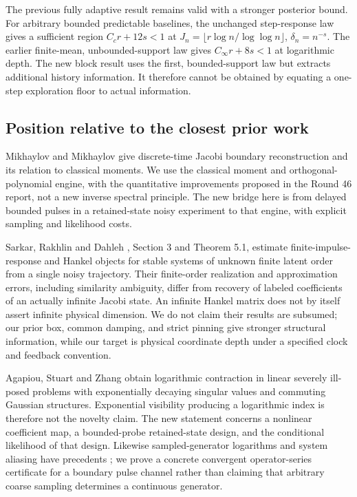 The previous fully adaptive result remains valid with a stronger posterior
bound. For arbitrary bounded predictable baselines, the unchanged step-response
law gives a sufficient region $C_c r+12s<1$ at
$J_n=\lfloor r\log n/\log\log n\rfloor$, $\delta_n=n^{-s}$.
The earlier finite-mean, unbounded-support law gives $C_\infty r+8s<1$
at logarithmic depth. The new block result uses the first, bounded-support
law but extracts additional history information. It therefore cannot be obtained
by equating a one-step exploration floor to actual information.

\subsection{Position relative to the closest prior work}
Mikhaylov and Mikhaylov \cite{MM2019,MM2020} give discrete-time Jacobi boundary
reconstruction and its relation to classical moments. We use the classical
moment and orthogonal-polynomial engine, with the quantitative improvements
proposed in the Round 46 report, not a new inverse spectral principle.
The new bridge here is from delayed bounded pulses in a retained-state noisy
experiment to that engine, with explicit sampling and likelihood costs.

Sarkar, Rakhlin and Dahleh \cite{SRD2021}, Section 3 and Theorem 5.1, estimate
finite-impulse-response and Hankel objects for stable systems of unknown finite
latent order from a single noisy trajectory. Their finite-order realization
and approximation errors, including similarity ambiguity, differ from recovery
of labeled coefficients of an actually infinite Jacobi state. An infinite
Hankel matrix does not by itself assert infinite physical dimension. We do not
claim their results are subsumed; our prior box, common damping, and strict
pinning give stronger structural information, while our target is physical
coordinate depth under a specified clock and feedback convention.

Agapiou, Stuart and Zhang \cite{ASZ2014} obtain logarithmic contraction in
linear severely ill-posed problems with exponentially decaying singular values
and commuting Gaussian structures. Exponential visibility producing a logarithmic
index is therefore not the novelty claim. The new statement concerns a
nonlinear coefficient map, a bounded-probe retained-state design, and the
conditional likelihood of that design. Likewise sampled-generator logarithms
and system aliasing have precedents \cite{YTG2016}; we prove a concrete convergent
operator-series certificate for a boundary pulse channel rather than claiming
that arbitrary coarse sampling determines a continuous generator.

